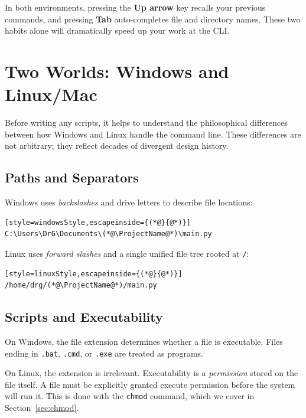 \begin{tipbox}
In both environments, pressing the \textbf{Up arrow} key recalls your
previous commands, and pressing \textbf{Tab} auto-completes file and
directory names. These two habits alone will dramatically speed up your
work at the CLI.
\end{tipbox}

\section{Two Worlds: Windows and Linux/Mac}
\label{sec:two-worlds}

Before writing any scripts, it helps to understand the philosophical
differences between how Windows and Linux handle the command line. These
differences are not arbitrary; they reflect decades of divergent design
history.

\subsection{Paths and Separators}

Windows uses \emph{backslashes} and drive letters to describe file
locations:
\begin{lstlisting}[style=windowsStyle,escapeinside={(*@}{@*)}]
C:\Users\DrG\Documents\(*@\ProjectName@*)\main.py
\end{lstlisting}

Linux uses \emph{forward slashes} and a single unified file tree rooted
at \texttt{/}:
\begin{lstlisting}[style=linuxStyle,escapeinside={(*@}{@*)}]
/home/drg/(*@\ProjectName@*)/main.py
\end{lstlisting}

\subsection{Scripts and Executability}

On Windows, the file extension determines whether a file is executable.
Files ending in \texttt{.bat}, \texttt{.cmd}, or \texttt{.exe} are treated
as programs.

On Linux, the extension is irrelevant. Executability is a \emph{permission}
stored on the file itself. A file must be explicitly granted execute
permission before the system will run it. This is done with the
\texttt{chmod} command, which we cover in Section~\ref{sec:chmod}.

